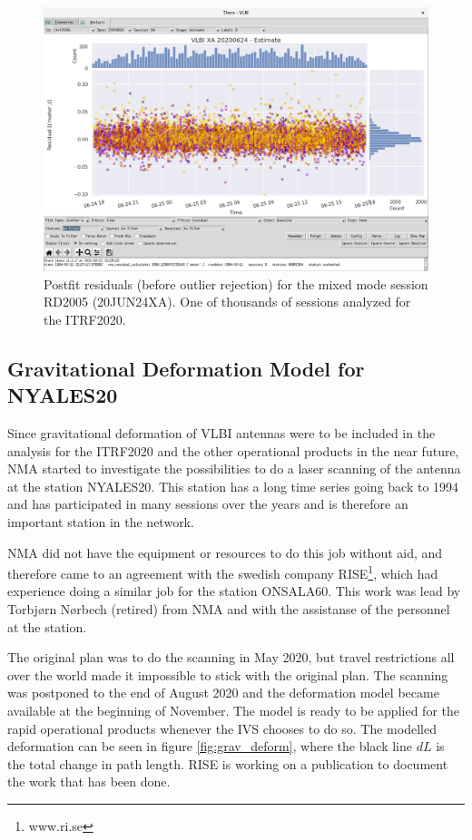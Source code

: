 \documentclass[twocolumn,twoside]{svmultivs_br} %
\begin{document}
\begin{figure}[htb!]
\begin{center}
\includegraphics[width=16.0cm]{acnma02.png}
\end{center}
\caption{Postfit residuals (before outlier rejection) for the mixed mode session RD2005 (20JUN24XA). One of thousands
of sessions analyzed for the ITRF2020.}
\label{fig:there}
\end{figure}

\subsection{Gravitational Deformation Model for NYALES20}
Since gravitational deformation of VLBI antennas were to be included in the analysis for the ITRF2020 and the other
operational products
in the near future, NMA started to investigate the possibilities to do a laser scanning of the antenna at the station
NYALES20. This station has a long
time series going back to 1994 and has participated in many sessions over the years and is therefore an important station
in the network.

NMA did not have the equipment or resources to do this job without aid, and therefore came to an agreement with
the swedish company RISE\footnote{www.ri.se}, which had experience doing a similar job for the station ONSALA60. This
work was lead by Torbj\o rn N\o rbech (retired) from NMA and with the assistanse of the personnel at the station.

The original plan was to do the scanning in May 2020, but travel restrictions all over the world made it impossible to
stick with the original plan. The scanning was postponed to the end of August 2020 and the deformation model became available at the
beginning of November. The model is ready to be applied for the rapid operational products whenever the IVS chooses to
do so. The modelled deformation can be seen in figure \ref{fig:grav_deform}, where the black line $dL$ is the total
change in path length. RISE is working on a publication to document the work that has been done.
\end{document}
